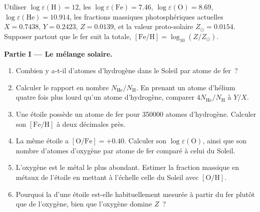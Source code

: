 \begin{problem}
\label{pb:b3:origin-of-elements:1}
Utiliser $\log\varepsilon(\mathrm{H}) = 12$, les 
$\log\varepsilon(\mathrm{Fe}) = 7.46$, $\log\varepsilon(\mathrm{O}) =
8.69$, $\log\varepsilon(\mathrm{He}) = 10.914$, les fractions massiques
photosphériques actuelles $X = 0.7438$, $Y = 0.2423$, $Z = 0.0139$,
et la valeur proto-solaire $Z_\odot = 0.0154$. Supposer partout que le fer
suit la  totale, $[\mathrm{Fe/H}] = \log_{10}(Z/Z_\odot)$.

\medskip\noindent\textbf{Partie I --- Le mélange solaire.}
\begin{enumerate}
\item Combien y a-t-il d'atomes d'hydrogène dans le Soleil par atome de fer~?
\item Calculer le rapport en nombre $N_\mathrm{He}/N_\mathrm{H}$. En prenant
  un atome d'hélium quatre fois plus lourd qu'un atome d'hydrogène, comparer
  $4N_\mathrm{He}/N_\mathrm{H}$ à $Y/X$.
\item Une étoile possède un atome de fer pour \num{350000} atomes d'hydrogène.
  Calculer son $[\mathrm{Fe/H}]$ à deux décimales près.
\item La même étoile a $[\mathrm{O/Fe}] = +0.40$. Calculer son
  $\log\varepsilon(\mathrm{O})$, ainsi que son nombre d'atomes d'oxygène par
  atome de fer comparé à celui du Soleil.
\item L'oxygène est le métal le plus abondant. Estimer la fraction massique
  en métaux de l'étoile en mettant à l'échelle celle du Soleil avec $[\mathrm{O/H}]$.
\item Pourquoi la  d'une étoile est-elle habituellement mesurée à
  partir du fer plutôt que de l'oxygène, bien que l'oxygène domine $Z$~?
\end{enumerate}


\end{problem}

